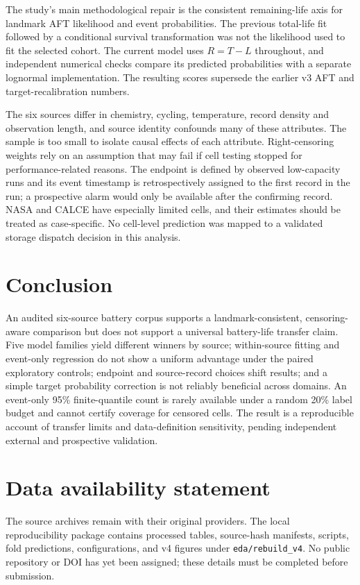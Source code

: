\documentclass[preprint,12pt]{elsarticle}
\begin{document}
The study's main methodological repair is the consistent remaining-life axis for landmark AFT likelihood and event probabilities. The previous total-life fit followed by a conditional survival transformation was not the likelihood used to fit the selected cohort. The current model uses $R=T-L$ throughout, and independent numerical checks compare its predicted probabilities with a separate lognormal implementation. The resulting scores supersede the earlier v3 AFT and target-recalibration numbers.

The six sources differ in chemistry, cycling, temperature, record density and observation length, and source identity confounds many of these attributes. The sample is too small to isolate causal effects of each attribute. Right-censoring weights rely on an assumption that may fail if cell testing stopped for performance-related reasons. The endpoint is defined by observed low-capacity runs and its event timestamp is retrospectively assigned to the first record in the run; a prospective alarm would only be available after the confirming record. NASA and CALCE have especially limited cells, and their estimates should be treated as case-specific. No cell-level prediction was mapped to a validated storage dispatch decision in this analysis.

\section{Conclusion}
An audited six-source battery corpus supports a landmark-consistent, censoring-aware comparison but does not support a universal battery-life transfer claim. Five model families yield different winners by source; within-source fitting and event-only regression do not show a uniform advantage under the paired exploratory controls; endpoint and source-record choices shift results; and a simple target probability correction is not reliably beneficial across domains. An event-only 95\% finite-quantile count is rarely available under a random 20\% label budget and cannot certify coverage for censored cells. The result is a reproducible account of transfer limits and data-definition sensitivity, pending independent external and prospective validation.

\section*{Data availability statement}
The source archives remain with their original providers. The local reproducibility package contains processed tables, source-hash manifests, scripts, fold predictions, configurations, and v4 figures under \texttt{eda/rebuild\_v4}. No public repository or DOI has yet been assigned; these details must be completed before submission.
\end{document}
